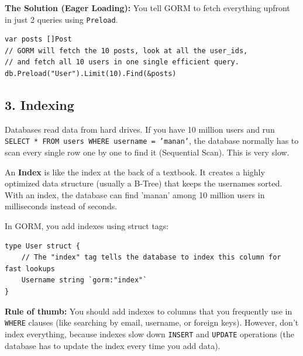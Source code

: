 \documentclass[11pt,a4paper]{article}
\begin{document}
\textbf{The Solution (Eager Loading):}
You tell GORM to fetch everything upfront in just 2 queries using \texttt{Preload}.
\begin{lstlisting}
var posts []Post
// GORM will fetch the 10 posts, look at all the user_ids, 
// and fetch all 10 users in one single efficient query.
db.Preload("User").Limit(10).Find(&posts)
\end{lstlisting}

\subsection{3. Indexing}
Databases read data from hard drives. If you have 10 million users and run \texttt{SELECT * FROM users WHERE username = 'manan'}, the database normally has to scan every single row one by one to find it (Sequential Scan). This is very slow.

An \textbf{Index} is like the index at the back of a textbook. It creates a highly optimized data structure (usually a B-Tree) that keeps the usernames sorted. With an index, the database can find 'manan' among 10 million users in milliseconds instead of seconds.

In GORM, you add indexes using struct tags:
\begin{lstlisting}
type User struct {
    // The "index" tag tells the database to index this column for fast lookups
    Username string `gorm:"index"` 
}
\end{lstlisting}
\textbf{Rule of thumb:} You should add indexes to columns that you frequently use in \texttt{WHERE} clauses (like searching by email, username, or foreign keys). However, don't index everything, because indexes slow down \texttt{INSERT} and \texttt{UPDATE} operations (the database has to update the index every time you add data).
\end{document}
